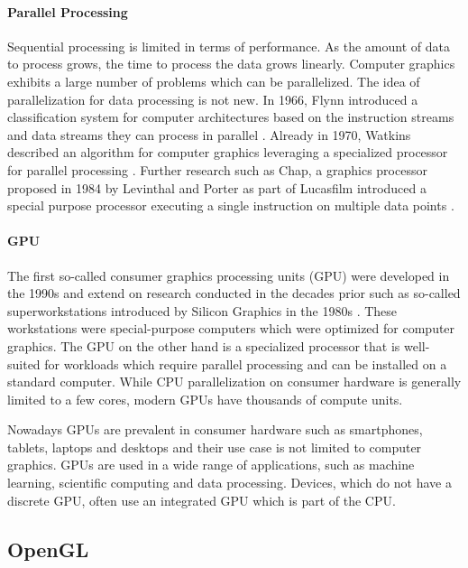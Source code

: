\paragraph{Parallel Processing}

Sequential processing is limited in terms of performance. As the amount of data to process grows, the time to process the data grows linearly. Computer graphics exhibits a large number of problems which can be parallelized. The idea of parallelization for data processing is not new. In 1966, Flynn introduced a classification system for computer architectures based on the instruction streams and data streams they can process in parallel \cite{flynnTaxonomy,flynnTaxonomy2}. Already in 1970, Watkins described an algorithm for computer graphics leveraging a specialized processor for parallel processing \cite{surfaceAlgorithmProcessor}. Further research such as Chap, a  graphics processor proposed in 1984 by Levinthal and Porter as part of Lucasfilm introduced a special purpose processor executing a single instruction on multiple data points \cite{chapSIMDgpu}.

\paragraph{GPU}

The first so-called consumer graphics processing units (GPU) were developed in the 1990s and extend on research conducted in the decades prior such as so-called superworkstations introduced by Silicon Graphics in the 1980s \cite{sigWorkstation}. These workstations were special-purpose computers which were optimized for computer graphics. The GPU on the other hand is a specialized processor that is well-suited for workloads which require parallel processing and can be installed on a standard computer. While CPU parallelization on consumer hardware is generally limited to a few cores, modern GPUs have thousands of compute units.

Nowadays GPUs are prevalent in consumer hardware such as smartphones, tablets, laptops and desktops and their use case is not limited to computer graphics. GPUs are used in a wide range of applications, such as machine learning, scientific computing and data processing. Devices, which do not have a discrete GPU, often use an integrated GPU which is part of the CPU.

\subsection{OpenGL}

